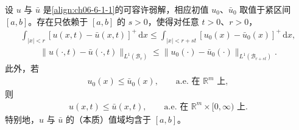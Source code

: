 \documentclass[../../main.tex]{subfiles}
\begin{document}
\begin{theorem}\label{theorem:ch06-6-2-3}
设 $u$ 与 $\bar{u}$ 是\eqref{align:ch06-6-1-1}的可容许弱解，相应初值 $u_{0}$、$\bar{u}_{0}$ 取值于紧区间 $[a,b]$。存在只依赖于 $[a,b]$ 的 $s>0$，使得对任意 $t>0$、$r>0$，
\begin{align}
\int_{|x|<r}[u(x,t)-\bar{u}(x,t)]^{+}\,\mathrm{d}x\leqslant\int_{|x|<r+st}[u_{0}(x)-\bar{u}_{0}(x)]^{+}\,\mathrm{d}x,
\label{align:ch06-6-2-8}
\end{align}
\begin{align}
\|u(\cdot,t)-\bar{u}(\cdot,t)\|_{L^{1}(\mathscr{B}_{r})}\leqslant\|u_{0}(\cdot)-\bar{u}_{0}(\cdot)\|_{L^{1}(\mathscr{B}_{r+st})}.
\label{align:ch06-6-2-9}
\end{align}
此外，若
\begin{align}
u_{0}(x)\leqslant\bar{u}_{0}(x),\qquad\text{a.e.\ 在 }\mathbb{R}^{m}\text{ 上},
\label{align:ch06-6-2-10}
\end{align}
则
\begin{align}
u(x,t)\leqslant\bar{u}(x,t),\qquad\text{a.e.\ 在 }\mathbb{R}^{m}\times[0,\infty)\text{ 上}.
\label{align:ch06-6-2-11}
\end{align}
特别地，$u$ 与 $\bar{u}$ 的（本质）值域均含于 $[a,b]$。
\end{theorem}
\end{document}
